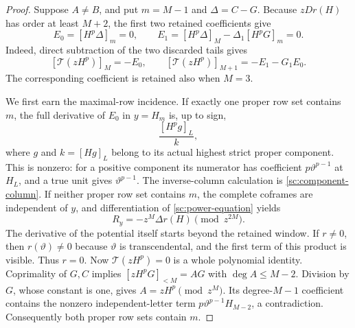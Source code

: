 \documentclass[11pt,a4paper]{amsart}
\numberwithin{equation}{section}
\theoremstyle{plain}
\theoremstyle{definition}
\begin{document}
\begin{proof}
Suppose \(A\ne B\), and put \(m=M-1\) and \(\Delta=C-G\).
Because \(zD r(H)\) has order at least \(M+2\), the first two retained
coefficients give
\begin{equation}\label{sc:two-endpoints}
 E_0=[H^p\Delta]_m=0,\qquad
 E_1=[H^p\Delta]_M-\Delta_1[H^pG]_m=0.
\end{equation}
Indeed, direct subtraction of the two discarded tails gives
\[
 [\mathcal T(zH^p)]_M=-E_0,\qquad
 [\mathcal T(zH^p)]_{M+1}=-E_1-G_1E_0.
\]
The corresponding coefficient is retained also when \(M=3\).

We first earn the maximal-row incidence.  If exactly one proper row
set contains \(m\), the full derivative of \(E_0\) in \(y=H_m\) is, up to
sign,
\[
 \frac{[H^pg]_L}{k},
\]
where \(g\) and \(k=[Hg]_L\) belong to its actual highest strict proper
component.  This is nonzero: for a positive component its numerator
has coefficient \(p\vartheta^{p-1}\) at \(H_L\), and a true unit gives
\(\vartheta^{p-1}\).  The inverse-column calculation is
\eqref{sc:component-column}.  If neither proper row set contains \(m\),
the complete coframes are independent of \(y\), and differentiation of
\eqref{sc:power-equation} yields
\[
 R_y=-z^M\Delta r(H)\pmod {z^{2M}}.
\]
The derivative of the potential itself starts beyond the retained
window.  If \(r\ne0\), then \(r(\vartheta)\ne0\) because \(\vartheta\) is transcendental,
and the first term of this product is visible.  Thus \(r=0\).
Now \(\mathcal T(zH^p)=0\) is a whole polynomial identity.  Coprimality
of \(G,C\) implies \([zH^pG]_{<M}=AG\) with \(\deg A\le M-2\).
Division by \(G\), whose constant is one, gives
\(A=zH^p\pmod {z^M}\).  Its degree-\(M-1\) coefficient contains the
nonzero independent-letter term \(p\vartheta^{p-1}H_{M-2}\), a contradiction.
Consequently both proper row sets contain \(m\).


\end{proof}
\end{document}
